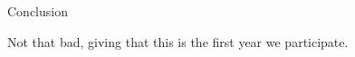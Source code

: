 \begin{section}{Conclusion}


Not that bad, giving that this is the first year we participate.

\end{section}

